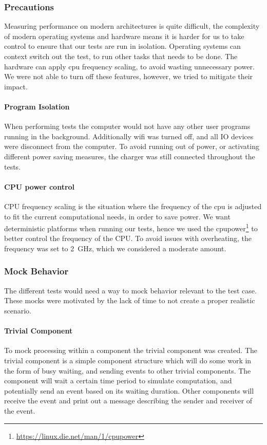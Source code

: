 \subsubsection{Precautions}
Measuring performance on modern architectures is quite difficult, the complexity of modern operating systems and hardware means
it is harder for us to take control to ensure that our tests are run in isolation.
Operating systems can context switch out the test, to run other tasks that needs to be done.
The hardware can apply cpu frequency scaling, to avoid wasting unnecessary power.
We were not able to turn off these features, however, we tried to mitigate their impact.

\paragraph{Program Isolation}
When performing tests the computer would not have any other user programs running in the background.
Additionally wifi was turned off, and all IO devices were disconnect from the computer.
To avoid running out of power, or activating different power saving measures, the charger was still connected
throughout the tests.

\paragraph{CPU power control}
CPU frequency scaling is the situation where the frequency of the cpu is adjusted to fit the current computational needs,
in order to save power.
We want deterministic platforms when running our tests, hence we used the cpupower\footnote{\url{https://linux.die.net/man/1/cpupower}}
to better control the frequency of the CPU. To avoid issues with overheating, the frequency was set to \SI{2}{\giga\hertz},
which we considered a moderate amount.

\subsubsection{Mock Behavior}
The different tests would need a way to mock behavior relevant to the test case.
These mocks were motivated by the lack of time to not create a proper realistic scenario.

\paragraph{Trivial Component}
\label{par:test_cases_trivial_component}
To mock processing within a component the trivial component was created.
The trivial component is a simple component structure which will do some work in the form of busy waiting,
and sending events to other trivial components.
The component will wait a certain time period to simulate computation, and potentially send an event
based on its waiting duration.
Other components will receive the event and print out a message describing the sender and receiver of the event.

